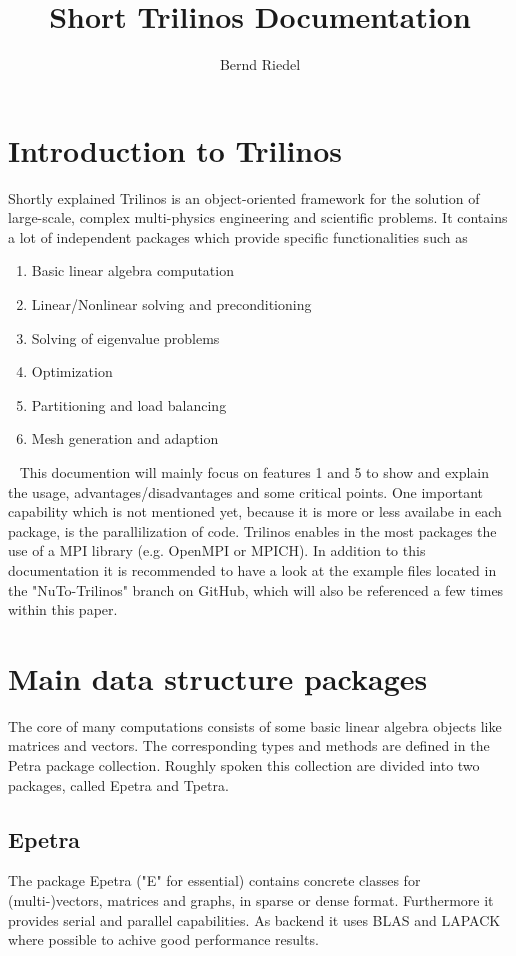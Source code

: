 \documentclass[10pt,a4paper,final,titlepage]{article}
\author{Bernd Riedel}
\title{Short Trilinos Documentation}
\begin{document}
\maketitle

\tableofcontents
\newpage

\section{Introduction to Trilinos}
Shortly explained Trilinos is an object-oriented framework for the solution of large-scale, complex multi-physics engineering and scientific problems. It contains a lot of independent packages which provide specific functionalities such as
\begin{enumerate}
\item Basic linear algebra computation
\item Linear/Nonlinear solving and preconditioning
\item Solving of eigenvalue problems
\item Optimization
\item Partitioning and load balancing
\item Mesh generation and adaption
\end{enumerate}
\ \newline
This documention will mainly focus on features 1 and 5 to show and explain the usage, advantages/disadvantages and some critical points. One important capability which is not mentioned yet, because it is more or less availabe in each package, is the parallilization of code. Trilinos enables in the most packages the use of a MPI library (e.g. OpenMPI or MPICH).
\newline
In addition to this documentation it is recommended to have a look at the example files located in the "NuTo-Trilinos" branch on GitHub, which will also be referenced a few times within this paper.

\section{Main data structure packages}
The core of many computations consists of some basic linear algebra objects like matrices and vectors. The corresponding types and methods are defined in the Petra package collection. Roughly spoken this collection are divided into two packages, called Epetra and Tpetra.

\subsection{Epetra}
The package Epetra ("E" for essential) contains concrete classes for (multi-)vectors, matrices and graphs, in sparse or dense format. Furthermore it provides serial and parallel capabilities. As backend it uses BLAS and LAPACK where possible to achive good performance results.
\end{document}
